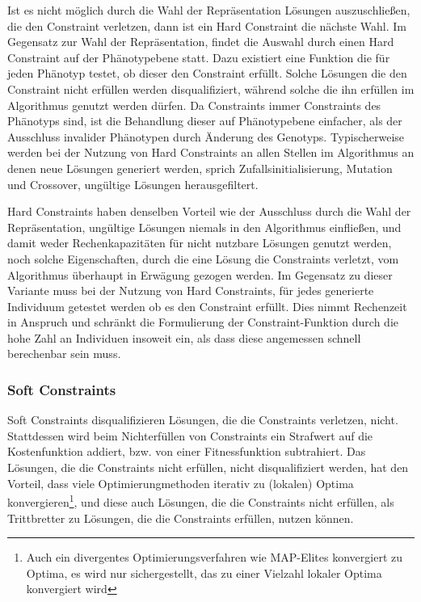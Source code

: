 Ist es nicht möglich durch die Wahl der Repräsentation Lösungen auszuschließen, die den Constraint verletzen, dann ist ein Hard Constraint die nächste Wahl.
Im Gegensatz zur Wahl der Repräsentation, findet die Auswahl durch einen Hard Constraint auf der Phänotypebene statt.
Dazu existiert eine Funktion die für jeden Phänotyp testet, ob dieser den Constraint erfüllt.
Solche Lösungen die den Constraint nicht erfüllen werden disqualifiziert, während solche die ihn erfüllen im Algorithmus genutzt werden dürfen.
Da Constraints immer Constraints des Phänotyps sind, ist die Behandlung dieser auf Phänotypebene einfacher, als der Ausschluss invalider Phänotypen durch Änderung des Genotyps.
Typischerweise werden bei der Nutzung von Hard Constraints an allen Stellen im Algorithmus an denen neue Lösungen generiert werden, sprich Zufallsinitialisierung, Mutation und Crossover, ungültige Lösungen herausgefiltert.

Hard Constraints haben denselben Vorteil wie der Ausschluss durch die Wahl der Repräsentation, ungültige Lösungen niemals in den Algorithmus einfließen, und damit weder Rechenkapazitäten für nicht nutzbare Lösungen genutzt werden, noch solche Eigenschaften, durch die eine Lösung die Constraints verletzt, vom Algorithmus überhaupt in Erwägung gezogen werden.
Im Gegensatz zu dieser Variante muss bei der Nutzung von Hard Constraints, für jedes generierte Individuum getestet werden ob es den Constraint erfüllt.
Dies nimmt Rechenzeit in Anspruch und schränkt die Formulierung der Constraint-Funktion durch die hohe Zahl an Individuen insoweit ein, als dass diese angemessen schnell berechenbar sein muss.



\subsubsection{Soft Constraints}
Soft Constraints disqualifizieren Lösungen, die die Constraints verletzen, nicht.
Stattdessen wird beim Nichterfüllen von Constraints ein Strafwert auf die Kostenfunktion addiert, bzw. von einer Fitnessfunktion subtrahiert.
Das Lösungen, die die Constraints nicht erfüllen, nicht disqualifiziert werden, hat den Vorteil, dass viele Optimierungmethoden iterativ zu (lokalen) Optima konvergieren\footnote{Auch ein divergentes Optimierungsverfahren wie MAP-Elites konvergiert zu Optima, es wird nur sichergestellt, das zu einer Vielzahl lokaler Optima konvergiert wird}, 
und diese auch Lösungen, die die Constraints nicht erfüllen, als Trittbretter zu Lösungen, die die Constraints erfüllen, nutzen können.

